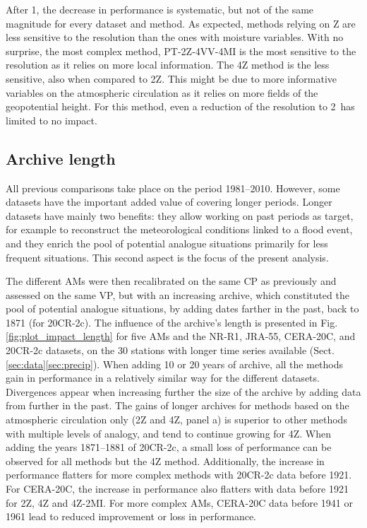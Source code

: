 \documentclass{ametsoc}
\begin{document}
After 1\degree, the decrease in performance is systematic, but not of the same magnitude for every dataset and method. As expected, methods relying on Z are less sensitive to the resolution than the ones with moisture variables. With no surprise, the most complex method, PT-2Z-4VV-4MI is the most sensitive to the resolution as it relies on more local information. The 4Z method is the less sensitive, also when compared to 2Z. This might be due to more informative variables on the atmospheric circulation as it relies on more fields of the geopotential height. For this method, even a reduction of the resolution to 2\degree\ has limited to no impact.


\subsection{Archive length}
\label{sec:length}

All previous comparisons take place on the period 1981--2010. However, some datasets have the important added value of covering longer periods. Longer datasets have mainly two benefits: they allow working on past periods as target, for example to reconstruct the meteorological conditions linked to a flood event, and they enrich the pool of potential analogue situations primarily for less frequent situations. This second aspect is the focus of the present analysis. 

The different AMs were then recalibrated on the same CP as previously and assessed on the same VP, but with an increasing archive, which constituted the pool of potential analogue situations, by adding dates farther in the past, back to 1871 (for 20CR-2c). The influence of the archive's length is presented in Fig. \ref{fig:plot_impact_length} for five AMs and the NR-R1, JRA-55, CERA-20C, and 20CR-2c datasets, on the 30 stations with longer time series available (Sect. \ref{sec:data}\ref{sec:precip}). When adding 10 or 20 years of archive, all the methods gain in performance in a relatively similar way for the different datasets. Divergences appear when increasing further the size of the archive by adding data from further in the past. The gains of longer archives for methods based on the atmospheric circulation only (2Z and 4Z, panel a) is superior to other methods with multiple levels of analogy, and tend to continue growing for 4Z. When adding the years 1871--1881 of 20CR-2c, a small loss of performance can be observed for all methods but the 4Z method. Additionally, the increase in performance flatters for more complex methods with 20CR-2c data before 1921. For CERA-20C, the increase in performance also flatters with data before 1921 for 2Z, 4Z and 4Z-2MI. For more complex AMs, CERA-20C data before 1941 or 1961 lead to reduced improvement or loss in performance.
\end{document}
